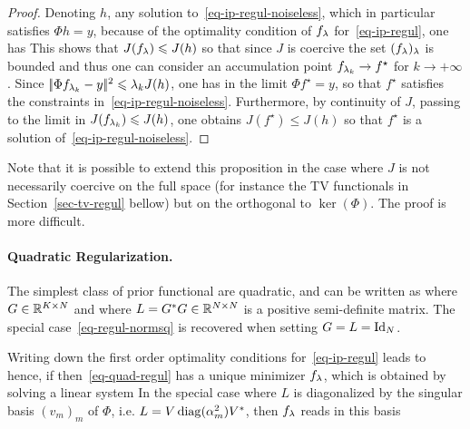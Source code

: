 \begin{proof}
	Denoting $h$, any solution to~\eqref{eq-ip-regul-noiseless}, which in particular satisfies $\Phi h = y$, because of the optimality condition of $f_\lambda$ for~\eqref{eq-ip-regul}, one has
	This shows that $J(f_\lambda) \leqslant J(h)$ so that since $J$ is coercive the set $(f_\lambda)_\lambda$ is bounded and thus one can consider an accumulation point $f_{\lambda_k} \rightarrow f^\star$ for $k \rightarrow +\infty$.  Since $|\!| \Phi f_{\lambda_k}-y |\!|^2 \leqslant \lambda_k J(h)$, one has in the limit $\Phi f^\star = y$, so that $f^\star$ satisfies the constraints in~\eqref{eq-ip-regul-noiseless}. Furthermore, by continuity of $J$, passing to the limit in $J(f_{\lambda_k}) \leqslant J(h)$, one obtains $J(f^\star) \leq J(h)$ so that $f^\star$ is a solution of~\eqref{eq-ip-regul-noiseless}. 
\end{proof}

Note that it is possible to extend this proposition in the case where $J$ is not necessarily coercive on the full space (for instance the TV functionals in Section~\ref{sec-tv-regul} bellow) but on the orthogonal to $\ker(\Phi)$. The proof is more difficult.


\paragraph{Quadratic Regularization.}

The simplest class of prior functional are quadratic, and can be written as
where $G \in \mathbb{R}^{K \times N}$ and 
where $L=G^*G \in \mathbb{R}^{N \times N}$ is a positive semi-definite matrix.
%
The special case~\eqref{eq-regul-normsq} is recovered when setting $G=L=\mathrm{Id}_N$. 

Writing down the first order optimality conditions for~\eqref{eq-ip-regul} leads to
hence, if
then~\eqref{eq-quad-regul} has a unique minimizer $f_\lambda$, which is obtained by solving a linear system
In the special case where $L$ is diagonalized by the singular basis $(v_m)_m$ of $\Phi$, i.e. $L=V \operatorname{diag}(\alpha_m^2) V^*$, then $f_\lambda$ reads in this basis 



